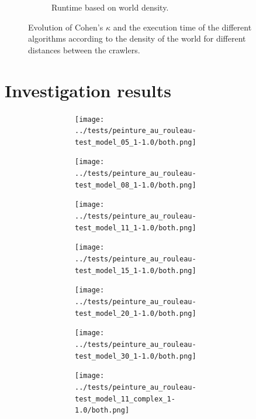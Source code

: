\begin{theappendices}
\begin{figure}[H]
\begin{subfigure}[t]{0.9\linewidth}
				\caption{Runtime based on world density.}
				\label{fig:investigation_polygonale-peinture_au_rouleau_ski_nordique-time_for_each_d_vs_investigation_polygonale-time_for_each_d}
			\end{subfigure}
			\caption{Evolution of Cohen's $\kappa$ and the execution time of the different algorithms according to the density of the world for different distances between the crawlers.}
			\label{fig:investigation_polygonale-peinture_au_rouleau_ski_nordique_for_each_d}
		\end{figure}

	\chapter{Investigation results}\label{annexe:resultat}

		\begin{figure}[H]
			\centering
			\begin{subfigure}[t]{\linewidth}
				\centering
				\begin{subfigure}[t]{0.12\linewidth}
					\texttt{[image: ../tests/peinture\_au\_rouleau-test\_model\_05\_1-1.0/both.png]}
				\end{subfigure}
				\hfill
				\begin{subfigure}[t]{0.11\linewidth}
					\texttt{[image: ../tests/peinture\_au\_rouleau-test\_model\_08\_1-1.0/both.png]}
				\end{subfigure}
				\hfill
				\begin{subfigure}[t]{0.11\linewidth}
					\texttt{[image: ../tests/peinture\_au\_rouleau-test\_model\_11\_1-1.0/both.png]}
				\end{subfigure}
				\hfill
				\begin{subfigure}[t]{0.11\linewidth}
					\texttt{[image: ../tests/peinture\_au\_rouleau-test\_model\_15\_1-1.0/both.png]}
				\end{subfigure}
				\hfill
				\begin{subfigure}[t]{0.11\linewidth}
					\texttt{[image: ../tests/peinture\_au\_rouleau-test\_model\_20\_1-1.0/both.png]}
				\end{subfigure}
				\hfill
				\begin{subfigure}[t]{0.11\linewidth}
					\texttt{[image: ../tests/peinture\_au\_rouleau-test\_model\_30\_1-1.0/both.png]}
				\end{subfigure}
				\hfill
				\begin{subfigure}[t]{0.11\linewidth}
					\texttt{[image: ../tests/peinture\_au\_rouleau-test\_model\_11\_complex\_1-1.0/both.png]}

\end{subfigure}
\end{subfigure}
\end{figure}
\end{theappendices}
